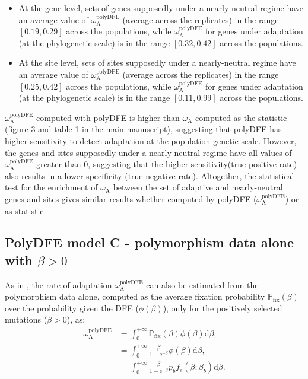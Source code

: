 \documentclass{article}
\newcommand{\der}{\mathrm{d}}
\newcommand{\e}{\mathrm{e}}
\newcommand{\rateApop}{\omega_{\mathrm{A}}}
\newcommand{\proba}{\mathbb{P}}
\newcommand{\pfix}{\proba_{\mathrm{fix}}}
\newcommand{\Spop}{\beta}
\begin{document}
    \begin{itemize}
        \item At the gene level, sets of genes supposedly under a nearly-neutral regime have an average value of $\rateApop^{\mathrm{polyDFE}}$ (average across the replicates) in the range $[0.19,0.29]$ across the populations, while $\rateApop^{\mathrm{polyDFE}}$ for genes under adaptation (at the phylogenetic scale) is in the range $[0.32,0.42]$ across the populations.
        \item At the site level, sets of sites supposedly under a nearly-neutral regime have an average value of $\rateApop^{\mathrm{polyDFE}}$ (average across the replicates) in the range $[0.25,0.42]$ across the populations, while $\rateApop^{\mathrm{polyDFE}}$ for genes under adaptation (at the phylogenetic scale) is in the range $[0.11,0.99]$ across the populations.
    \end{itemize}
    $\rateApop^{\mathrm{polyDFE}}$ computed with polyDFE is higher than $\rateApop$ computed as the \textcite{mcdonald_adaptative_1991} statistic (figure 3 and table 1 in the main manuscript), suggesting that polyDFE has higher sensitivity to detect adaptation at the population-genetic scale.
    However, the genes and sites supposedly under a nearly-neutral regime have all values of $\rateApop^{\mathrm{polyDFE}}$ greater than 0, suggesting that the higher sensitivity(true positive rate) also results in a lower specificity (true negative rate).
    Altogether, the statistical test for the enrichment of $\rateApop$ between the set of adaptive and nearly-neutral genes and sites gives similar results whether computed by polyDFE ($\rateApop^{\mathrm{polyDFE}}$) or as \textcite{mcdonald_adaptative_1991} statistic.

    \pagebreak

    \subsection{PolyDFE model C - polymorphism data alone with $\Spop > 0$}
    As in \textcite{tataru_inference_2017}, the rate of adaptation $\rateApop^{\mathrm{polyDFE}}$ can also be estimated from the polymorphism data alone, computed as the average fixation probability $\pfix (\Spop)$ over the probability given the DFE ($\phi (\Spop)$), only for the positively selected mutations ($\Spop > 0$), as:
    \begin{align}
        \rateApop^{\mathrm{polyDFE}} &= \int_{0}^{+\infty} \pfix (\Spop) \phi (\Spop) \der \Spop, \\
        &= \int_{0}^{+\infty} \frac{\Spop}{1 - \e^{-\Spop}} \phi (\Spop) \der \Spop, \\
        &= \int_{0}^{+\infty} \frac{\Spop}{1 - \e^{-\Spop}} p_b f_{e}(\Spop; \Spop_b) \der \Spop.
    \end{align}
    
\end{document}
